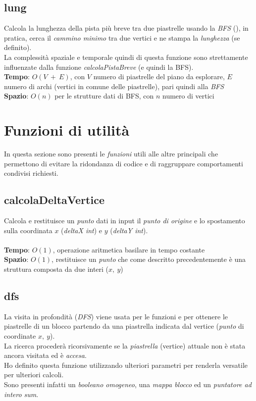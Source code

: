 \documentclass{article}
\begin{document}
\subsection{lung}
Calcola la lunghezza della pista più breve tra due piastrelle usando la \textit{BFS} (), in pratica, cerca il \textit{cammino minimo} tra due vertici e ne stampa la \textit{lunghezza} (se definito).\\
La complessità spaziale e temporale quindi di questa funzione sono strettamente influenzate dalla funzione \textit{calcolaPistaBreve} (e quindi la BFS).\\
\textbf{Tempo}: \(O(V\ +\ E)\), con \(V\) numero di piastrelle del piano da esplorare, \(E\) numero di archi (vertici in comune delle piastrelle), pari quindi alla \textit{BFS}\\
\textbf{Spazio}: \(O(n)\) per le strutture dati di BFS, con \(n\) numero di vertici

\section{Funzioni di utilità}
In questa sezione sono presenti le \textit{funzioni} utili alle altre  principali che permettono di evitare la ridondanza di codice e di raggruppare comportamenti condivisi richiesti.\\

\subsection{calcolaDeltaVertice}
Calcola e restituisce un \textit{punto} dati in input il \textit{punto di origine} e lo spostamento sulla coordinata \(x\) (\textit{deltaX int}) e \(y\) (\textit{deltaY int}).\\ \\
\textbf{Tempo}: \(O(1)\), operazione aritmetica basilare in tempo costante \\
\textbf{Spazio}: \(O(1)\), restituisce un \textit{punto} che come descritto precedentemente è una struttura composta da due interi (\(x,\ y\))

\subsection{dfs}\label{subsec:dfs}
La visita in profondità (\textit{DFS}) viene usata per le funzioni  e  per ottenere le piastrelle di un blocco partendo da una piastrella indicata dal vertice (\textit{punto} di coordinate \(x,\ y\)).\\
La ricerca procederà ricorsivamente se la \textit{piastrella} (vertice) attuale non è stata ancora visitata ed è \textit{accesa}.\\
Ho definito questa funzione utilizzando ulteriori parametri per renderla versatile per ulteriori calcoli.\\
Sono presenti infatti un \textit{booleano omogeneo}, una \textit{mappa blocco} ed un \textit{puntatore ad intero sum}.
\end{document}
